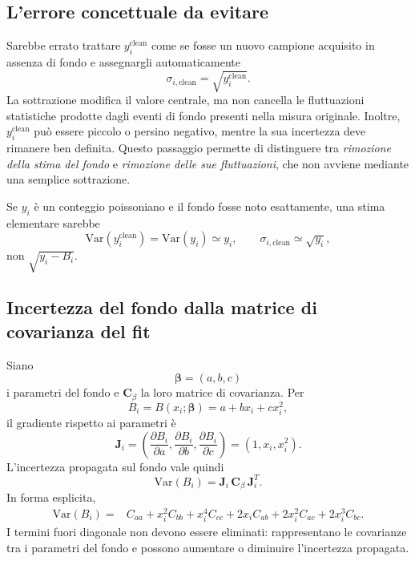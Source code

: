\documentclass[11pt,a4paper]{book}
\begin{document}
\subsection{L'errore concettuale da evitare}
Sarebbe errato trattare $y_i^{\mathrm{clean}}$ come se fosse un nuovo campione acquisito in assenza di fondo e assegnargli automaticamente
\begin{equation}
  \sigma_{i,\mathrm{clean}}=\sqrt{y_i^{\mathrm{clean}}}.
\end{equation}
La sottrazione modifica il valore centrale, ma non cancella le fluttuazioni statistiche prodotte dagli eventi di fondo presenti nella misura originale. Inoltre, $y_i^{\mathrm{clean}}$ può essere piccolo o persino negativo, mentre la sua incertezza deve rimanere ben definita. Questo passaggio permette di distinguere tra \emph{rimozione della stima del fondo} e \emph{rimozione delle sue fluttuazioni}, che non avviene mediante una semplice sottrazione.

Se $y_i$ è un conteggio poissoniano e il fondo fosse noto esattamente, una stima elementare sarebbe
\begin{equation}
  \mathrm{Var}(y_i^{\mathrm{clean}})=\mathrm{Var}(y_i)\simeq y_i,
  \qquad
  \sigma_{i,\mathrm{clean}}\simeq\sqrt{y_i},
\end{equation}
non $\sqrt{y_i-B_i}$.

\subsection{Incertezza del fondo dalla matrice di covarianza del fit}
Siano
\begin{equation}
  \bm\beta=(a,b,c)
\end{equation}
i parametri del fondo e $\mathbf C_{\beta}$ la loro matrice di covarianza. Per
\begin{equation}
 B_i=B(x_i;\bm\beta)=a+b x_i+c x_i^2,
\end{equation}
il gradiente rispetto ai parametri è
\begin{equation}
  \mathbf J_i=\left(\frac{\partial B_i}{\partial a},
  \frac{\partial B_i}{\partial b},
  \frac{\partial B_i}{\partial c}\right)
  =(1,x_i,x_i^2).
\end{equation}
L'incertezza propagata sul fondo vale quindi
\begin{equation}
  \mathrm{Var}(B_i)=\mathbf J_i\,\mathbf C_{\beta}\,\mathbf J_i^{T}.
\end{equation}
In forma esplicita,
\begin{align}
 \mathrm{Var}(B_i)={}&C_{aa}+x_i^2C_{bb}+x_i^4C_{cc}
 +2x_iC_{ab}+2x_i^2C_{ac}+2x_i^3C_{bc}.
\end{align}
I termini fuori diagonale non devono essere eliminati: rappresentano le covarianze tra i parametri del fondo e possono aumentare o diminuire l'incertezza propagata.
\end{document}
